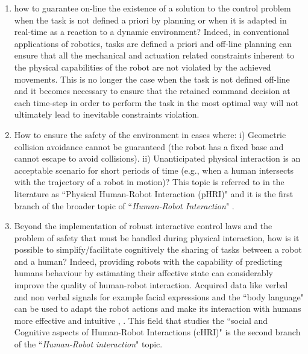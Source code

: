 \begin{enumerate}[label=\Alph*)]
\item how to guarantee on-line the existence of a solution to the control problem when the task is not defined a priori by planning or when it is adapted in real-time as a reaction to a dynamic environment? Indeed, in conventional applications of robotics, tasks are defined a priori and off-line planning can ensure that all the mechanical and actuation related constraints inherent to the physical capabilities of the robot are not violated by the achieved movements. This is no longer the case when the task is not defined off-line and it becomes necessary to ensure that the retained command decision at each time-step in order to perform the task in the most optimal way will not ultimately lead to inevitable constraints violation.
\item How to ensure the safety of the environment in cases where: i) Geometric collision avoidance cannot be guaranteed (the robot has a fixed base and cannot escape to avoid collisions). ii) Unanticipated physical interaction is an acceptable scenario for short periods of time (e.g., when a human intersects with the trajectory of a robot in motion)? This topic is referred to in the literature as ``Physical Human-Robot Interaction (pHRI)" and it is the first branch of the broader topic of ``\textit{Human-Robot Interaction}" \cite{albu2005physical}.
\item Beyond the implementation of robust interactive control laws and the problem of safety that must be handled during physical interaction, how is it possible to simplify/facilitate cognitively the sharing of tasks between a robot and a human? Indeed, providing robots with the capability of predicting humans behaviour by estimating their affective state can considerably improve the quality of human-robot interaction. Acquired data like verbal and non verbal signals for example facial expressions and the ``body language" can be used to adapt the robot actions and make its interaction with humans more effective and intuitive \cite{kulic2007affective}, \cite{mavridis2015review}. This field that studies the ``social and Cognitive aspects of Human-Robot Interactions (cHRI)" is the second branch of the ``\textit{Human-Robot interaction}" topic.
\end{enumerate}
